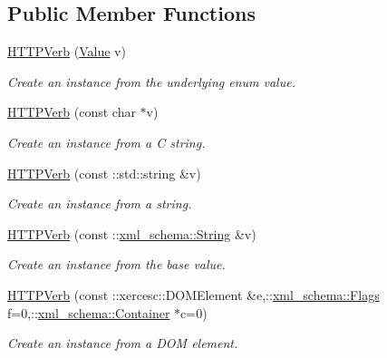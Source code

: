 \subsection*{Public Member Functions}
\begin{DoxyCompactItemize}
\item 
\hyperlink{classopenstack_1_1xml_1_1HTTPVerb_af746c469d5fadf50ff95a28aec28d3a5}{HTTPVerb} (\hyperlink{classopenstack_1_1xml_1_1HTTPVerb_a04bf58bd0d545f256c97c10787853217}{Value} v)
\begin{DoxyCompactList}\small\item\em Create an instance from the underlying enum value. \item\end{DoxyCompactList}\item 
\hyperlink{classopenstack_1_1xml_1_1HTTPVerb_a4353efddcb39e76f50e8481413f9be5b}{HTTPVerb} (const char $\ast$v)
\begin{DoxyCompactList}\small\item\em Create an instance from a C string. \item\end{DoxyCompactList}\item 
\hyperlink{classopenstack_1_1xml_1_1HTTPVerb_ad5b295aac05709eac24007d7cdeade79}{HTTPVerb} (const ::std::string \&v)
\begin{DoxyCompactList}\small\item\em Create an instance from a string. \item\end{DoxyCompactList}\item 
\hyperlink{classopenstack_1_1xml_1_1HTTPVerb_a9b2c7c07cf8788988b1ee631777a86f3}{HTTPVerb} (const ::\hyperlink{namespacexml__schema_af6757b5701ccc893f3b551bd70e0c94d}{xml\_\-schema::String} \&v)
\begin{DoxyCompactList}\small\item\em Create an instance from the base value. \item\end{DoxyCompactList}\item 
\hyperlink{classopenstack_1_1xml_1_1HTTPVerb_a53d5b3b8fe11d8f44f5ac4dd8b862e70}{HTTPVerb} (const ::xercesc::DOMElement \&e,::\hyperlink{namespacexml__schema_affb4c227cbd9aa7453dd1dc5a1401943}{xml\_\-schema::Flags} f=0,::\hyperlink{namespacexml__schema_a333dea2213742aea47a37532dec4ec27}{xml\_\-schema::Container} $\ast$c=0)
\begin{DoxyCompactList}\small\item\em Create an instance from a DOM element. \item\end{DoxyCompactList}\item 

\end{DoxyCompactItemize}
